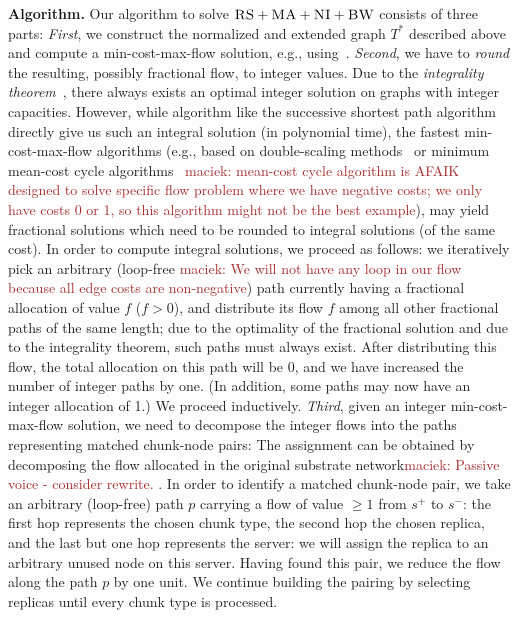 \documentclass[9pt]{sigcomm-alternate}
\newcommand{\maciek}[1]{\textcolor{brown}{maciek: #1}}
\newcommand{\Source}{\ensuremath{s^{+}}}
\newcommand{\Sink}{\ensuremath{s^{-}}}
\newcommand{\CC}{\textsc{NI}}
\newcommand{\RS}{\textsc{RS}}
\newcommand{\BW}{\textsc{BW}}
\newcommand{\MA}{\textsc{MA}}
\newcommand{\Tree}{\ensuremath{T}}
\begin{document}
\textbf{Algorithm.}
Our algorithm to solve $\RS+\MA+\CC+\BW$ consists of three parts:
\emph{First}, we construct the normalized and extended graph $\Tree^*$
described above and compute
a min-cost-max-flow solution, e.g., using~\cite{mincostmaxflow-1,mincostmaxflow-2}.
\emph{Second}, we have to \emph{round} the resulting, possibly fractional flow, to
integer values. Due to the \emph{integrality theorem}~\cite{flow-book},
there always exists an optimal integer solution on graphs with integer capacities.
However, while algorithm like the successive shortest path algorithm~\cite{successive_shortest_path_complexity}
directly give us such an integral solution (in polynomial time), the fastest min-cost-max-flow algorithms (e.g., based on double-scaling
methods~\cite{mincostmaxflow-1} or minimum mean-cost cycle algorithms~\cite{mincostmaxflow-2} \maciek{mean-cost cycle algorithm is AFAIK designed to solve specific flow problem where we have negative costs; we only have costs 0 or 1, so this algorithm might not  be the best example}), may yield fractional solutions
which need to be rounded to integral solutions (of the same cost).
In order to compute integral solutions, we proceed as follows: we iteratively pick an arbitrary (loop-free \maciek{We will not have any loop in our flow because all edge costs are non-negative}) path
currently having a fractional allocation of value $f$ ($f>0$), and distribute its flow $f$
among all other fractional paths of the same length; due to the optimality of the fractional solution
and due to the integrality theorem, such paths must always exist. After distributing this flow,
the total allocation on this path will be 0, and we have increased the number of integer paths by one.
(In addition, some paths may now have an integer allocation of 1.) We proceed inductively.
\emph{Third}, given an integer min-cost-max-flow solution, we need to decompose the integer flows into the paths
representing matched chunk-node pairs:
The assignment can be obtained by decomposing the flow allocated in the
original substrate network\maciek{Passive voice - consider rewrite.}
. In order to identify a matched chunk-node pair,
we take an arbitrary (loop-free) path $p$ carrying a flow of value  $\geq 1$ from $\Source$ to $\Sink$:
the first hop represents the chosen chunk type, the second hop the chosen
replica, and the last but one hop represents the server: we will assign
the replica to an arbitrary unused node on this server.
Having found this pair, we reduce the flow
along the path $p$ by one unit.
We continue building the pairing by selecting replicas until every chunk type is processed.
\end{document}
